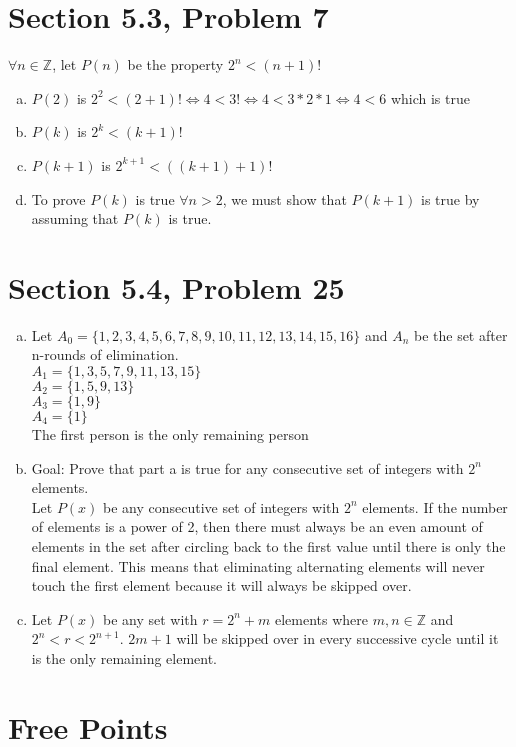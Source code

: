 \documentclass{article}
\begin{document}
\section*{Section 5.3, Problem 7}
$\forall n\in \mathbb{Z}$, let $P(n)$ be the property $2^n < (n+1)!$
\begin{enumerate}[a.]
	\item $P(2)$ is $2^2 < (2+1)! \iff 4 < 3! \iff 4 < 3*2*1 \iff 4 < 6$ which is true
	\item $P(k)$ is $2^k < (k+1)!$
	\item $P(k+1)$ is $2^{k+1} < ((k+1) + 1)!$
	\item To prove $P(k)$ is true $\forall n > 2$, we must show that $P(k+1)$ is true by assuming that $P(k)$ is true.
\end{enumerate}

\clearpage
\header

\section*{Section 5.4, Problem 25}
\begin{enumerate}[a.]
	\item Let $A_0=\{1, 2, 3, 4, 5, 6, 7, 8, 9, 10, 11, 12, 13, 14, 15, 16\}$ and $A_n$ be the set after n-rounds of elimination. \\
	$A_1=\{1,3,5,7,9,11,13,15\}$ \\
	$A_2=\{1,5,9,13\}$ \\
	$A_3=\{1,9\}$ \\
	$A_4=\{1\}$ \\
	The first person is the only remaining person
	\item Goal: Prove that part a is true for any consecutive set of integers with $2^n$ elements. \\
	Let $P(x)$ be any consecutive set of integers with $2^n$ elements. If the number of elements is a power of 2, then there must always be an even amount of elements in the set after circling back to the first value until there is only the final element. This means that eliminating alternating elements will never touch the first element because it will always be skipped over.
	\item Let $P(x)$ be any set with $r=2^n +m$ elements where $m,n\in \mathbb{Z}$ and $2^n < r< 2^{n+1}$. $2m+1$ will be skipped over in every successive cycle until it is the only remaining element. \\
\end{enumerate}

\clearpage
\header

\section*{Free Points}
\end{document}
